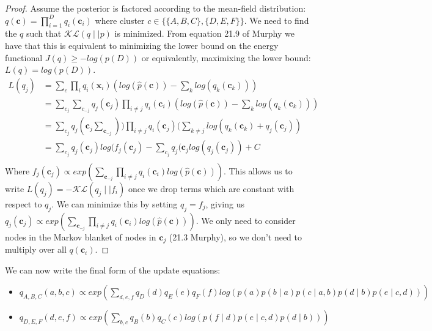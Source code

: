 \documentclass{article}
\begin{document}
\begin{proof}
   Assume the posterior is factored according to the mean-field distribution:
   $q(\textbf{c}) = \prod_{i=1}^{D} q_{i}(\textbf{c}_{i})$ 
   where cluster $c \in \{\{A,B,C\},\{D,E,F\}\}$.
   We need to find the $q$ such that $\mathcal{K}\mathcal{L} (q \mid \mid p)$ is minimized.
   From equation 21.9 of Murphy we have that this is equivalent to minimizing the lower
   bound on the energy functional $J(q) \ge -log(p(D))$ or equivalently, maximixing the
   lower bound: $L(q) = log(p(D))$.
  \begin{align*}
     L(q_{j}) &= \sum_{c} \prod_{i} q_{i} (\textbf{x}_{i}) (log(\hat{p} (\textbf{c})) - \sum_{k} log(q_{k} (\textbf{c}_{k}))) \\
     &= \sum_{c_{j}} \sum_{c_{-j}} q_{j} (\textbf{c}_{j}) \prod_{i \ne j} q_{i}(\textbf{c}_{i}) (log(\hat{p}(\textbf{c})) - \sum_{k} log(q_{k}(\textbf{c}_{k}))) \\
     &= \sum_{c_{j}} q_{j}(\textbf{c}_{j} \sum_{\textbf{c}_{-j}})) \prod_{i \ne j} q_{i}(\textbf{c}_{j})(\sum_{k \ne j} log(q_{k}(\textbf{c}_{k}) + q_{j}(\textbf{c}_{j})) \\
     &= \sum_{c_{j}} q_{j}(\textbf{c}_{j}) log(f_{j}(\textbf{c}_{j}) - \sum_{c_{j}} q_{j}(\textbf{c}_{j} log(q_{j}(\textbf{c}_{j})) + C \\
 \end{align*}
 Where $f_{j}(\textbf{c}_{j}) \propto exp(\sum_{\textbf{c}_{-j}} \prod_{i \ne j } q_{i}(\textbf{c}_{i}) log( \hat{p}(\textbf{c})))$.
This allows us to write $L(q_{j}) = - \mathcal{K} \mathcal{L} (q_{j} \mid \mid f_{i})$ once we drop terms which are constant with respect to $q_{j}$. We can minimize this by setting $q_{j} = f_{j}$,
 giving us $q_{j}(\textbf{c}_{j}) \propto exp(\sum_{\textbf{c}_{-j}} \prod_{i \ne j } q_{i}(\textbf{c}_{i}) log( \hat{p}(\textbf{c})))$.
 We only need to consider nodes in the Markov blanket of nodes in $\textbf{c}_{j}$ (21.3 Murphy), so we don't need to multiply over all $q(\textbf{c}_{i})$.
\end{proof}
We can now write the final form of the update equations:
\begin{itemize}
  \item $q_{A,B,C}(a,b,c) \propto exp(\sum_{d,e,f} q_{D}(d) q_{E}(e) q_{F}(f) log( p(a)p(b \mid a)p(c \mid a,b) p(d \mid b) p(e \mid c,d)))$
  \item $q_{D,E,F}(d,e,f) \propto exp(\sum_{b,c} q_{B}(b) q_{C}(c) log( p(f \mid d)p(e \mid c,d) p(d \mid b) ))$
\end{itemize}
\end{document}
